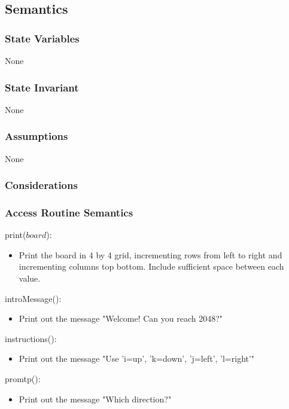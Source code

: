 \documentclass[12pt]{article}
\begin{document}
\subsection* {Semantics}

\subsubsection* {State Variables}

None

\subsubsection* {State Invariant}

None

\subsubsection* {Assumptions}

None

\subsubsection* {Considerations}

\subsubsection* {Access Routine Semantics}

\noindent print($\mathit{board}$):
\begin{itemize}
\item Print the board in 4 by 4 grid, incrementing rows from left to right and incrementing columns top bottom. Include sufficient space between each value.
\end{itemize} 

\noindent introMessage():
\begin{itemize}
\item Print out the message "Welcome! Can you reach 2048?"
\end{itemize} 

\noindent instructions():
\begin{itemize}
\item Print out the message "Use 'i=up', 'k=down', 'j=left', 'l=right'"
\end{itemize} 

\noindent promtp():
\begin{itemize}
\item Print out the message "Which direction?"
\end{itemize} 
\end{document}
